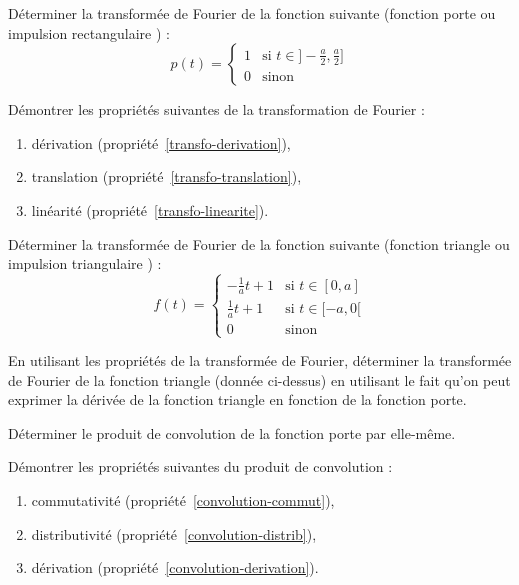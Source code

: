 

\exercice
%
Déterminer la transformée de Fourier de la fonction suivante (fonction
{ porte } ou { impulsion rectangulaire }) :
%
\begin{equation*}
p(t) =
\begin{cases}
1 & \mbox{si } t \in ] - \frac{a}{2},\frac a 2 ]\\
0 & \mbox{sinon}
\end{cases}
\end{equation*}

\exercice
%
Démontrer les propriétés suivantes de la transformation de Fourier :
\begin{enumerate}
\item dérivation (propriété~\ref{transfo-derivation}),
\item translation (propriété~\ref{transfo-translation}),
\item linéarité (propriété~\ref{transfo-linearite}).
\end{enumerate}

\exercice Déterminer la transformée de Fourier de la fonction suivante
(fonction { triangle } ou { impulsion triangulaire }) :
%
\begin{equation*}
f(t) =
\begin{cases}
-\frac 1 a  t + 1 & \mbox{si } t \in [ 0, a ]\\
\frac 1 a  t + 1 & \mbox{si } t \in [ -a, 0 [\\
0 & \mbox{sinon}
\end{cases}
\end{equation*}


\exercice En utilisant les propriétés de la transformée de Fourier,
déterminer la transformée de Fourier de la fonction triangle (donnée
ci-dessus) en utilisant le fait qu'on peut exprimer la dérivée de la
fonction triangle en fonction de la fonction porte.


\exercice \label{convol-porte} Déterminer le produit de convolution de la fonction porte
par elle-même.

\exercice 
Démontrer les propriétés suivantes du produit de convolution :
\begin{enumerate}

\item commutativité (propriété~\ref{convolution-commut}),

\item distributivité (propriété~\ref{convolution-distrib}),

\item dérivation (propriété~\ref{convolution-derivation}).

\end{enumerate}

